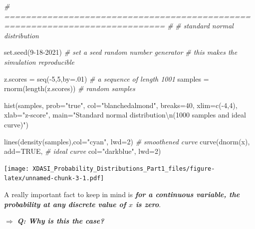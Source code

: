 \documentclass[
]{article}
\newenvironment{Shaded}{\begin{snugshade}}{\end{snugshade}}
\newcommand{\AttributeTok}[1]{\textcolor[rgb]{0.77,0.63,0.00}{#1}}
\newcommand{\CommentTok}[1]{\textcolor[rgb]{0.56,0.35,0.01}{\textit{#1}}}
\newcommand{\ConstantTok}[1]{\textcolor[rgb]{0.00,0.00,0.00}{#1}}
\newcommand{\DecValTok}[1]{\textcolor[rgb]{0.00,0.00,0.81}{#1}}
\newcommand{\FunctionTok}[1]{\textcolor[rgb]{0.00,0.00,0.00}{#1}}
\newcommand{\NormalTok}[1]{#1}
\newcommand{\OtherTok}[1]{\textcolor[rgb]{0.56,0.35,0.01}{#1}}
\newcommand{\SpecialCharTok}[1]{\textcolor[rgb]{0.00,0.00,0.00}{#1}}
\newcommand{\StringTok}[1]{\textcolor[rgb]{0.31,0.60,0.02}{#1}}
\begin{document}
\begin{Shaded}
\begin{Highlighting}[]
\CommentTok{\# ============================================================================ \#}
\CommentTok{\# standard normal distribution}

\FunctionTok{set.seed}\NormalTok{(}\DecValTok{9{-}18{-}2021}\NormalTok{)                 }\CommentTok{\# set a seed random number generator}
                                    \CommentTok{\# this makes the simulation reproducible}

\NormalTok{z.scores }\OtherTok{=} \FunctionTok{seq}\NormalTok{(}\SpecialCharTok{{-}}\DecValTok{5}\NormalTok{,}\DecValTok{5}\NormalTok{,}\AttributeTok{by=}\NormalTok{.}\DecValTok{01}\NormalTok{)         }\CommentTok{\# a sequence of length 1001}
\NormalTok{samples }\OtherTok{=} \FunctionTok{rnorm}\NormalTok{(}\FunctionTok{length}\NormalTok{(z.scores))   }\CommentTok{\# random samples }

\FunctionTok{hist}\NormalTok{(samples, }\AttributeTok{prob=}\StringTok{"true"}\NormalTok{, }\AttributeTok{col=}\StringTok{"blanchedalmond"}\NormalTok{, }
     \AttributeTok{breaks=}\DecValTok{40}\NormalTok{,}
     \AttributeTok{xlim=}\FunctionTok{c}\NormalTok{(}\SpecialCharTok{{-}}\DecValTok{4}\NormalTok{,}\DecValTok{4}\NormalTok{),}
     \AttributeTok{xlab=}\StringTok{"z{-}score"}\NormalTok{,}
     \AttributeTok{main=}\StringTok{"Standard normal distribution}\SpecialCharTok{\textbackslash{}n}\StringTok{(1000 samples and ideal curve)"}\NormalTok{)}

\FunctionTok{lines}\NormalTok{(}\FunctionTok{density}\NormalTok{(samples),}\AttributeTok{col=}\StringTok{"cyan"}\NormalTok{, }\AttributeTok{lwd=}\DecValTok{2}\NormalTok{)  }\CommentTok{\# smoothened curve}
\FunctionTok{curve}\NormalTok{(}\FunctionTok{dnorm}\NormalTok{(x), }\AttributeTok{add=}\ConstantTok{TRUE}\NormalTok{,                  }\CommentTok{\# ideal curve}
      \AttributeTok{col=}\StringTok{"darkblue"}\NormalTok{, }\AttributeTok{lwd=}\DecValTok{2}\NormalTok{)}
\end{Highlighting}
\end{Shaded}

\texttt{[image: XDASI\_Probability\_Distributions\_Part1\_files/figure-latex/unnamed-chunk-3-1.pdf]}

A really important fact to keep in mind is \textbf{\emph{for a
continuous variable, the probability at any discrete value of \(x\) is
zero}}.

\(\Rightarrow\) \textbf{\emph{Q: Why is this the case?}}
\end{document}
